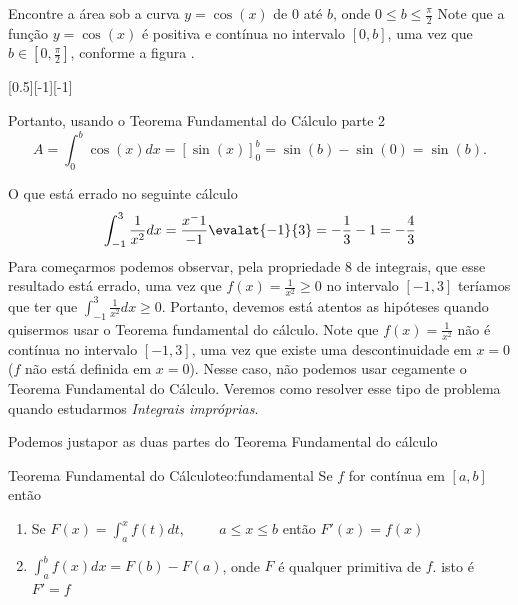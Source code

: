\begin{example}
  Encontre a área sob a curva $y=\cos(x) $ de $0$ até $b$, onde
  \(0 \leq b \leq \frac{\pi}{2}\)
  \solution
  Note que a função $y=\cos(x)$ é positiva e contínua no intervalo $[0,b]$,
  uma vez que \(b \in [0, \frac{\pi}{2}]\), conforme a figura .

  [0.5][-1][-1]

  Portanto, usando o Teorema Fundamental do Cálculo parte 2
  \[
  A
  = \int_0^b \cos(x) dx
  = \left[ \sin(x) \right]^{b}_{0}
  = \sin(b)- \sin(0)
  = \sin(b).
  \]
\end{example}

\begin{example}
  O que está errado no seguinte cálculo
  \[
  \int_{-1}^3 \frac{1}{x^2} dx
  = \frac{x^-1}{-1} \evalat{-1}{3}
  = - \frac{1}{3} - 1
  = - \frac{4}{3}
  \]
  \solution
  Para começarmos podemos observar, pela propriedade 8 de integrais, que esse
  resultado está errado, uma vez que $f(x)= \frac{1}{x^2} \geq 0$ no intervalo
  $[-1,3]$ teríamos que ter que $\int_{-1}^3 \frac{1}{x^2} dx \geq 0$.
  Portanto, devemos está atentos as hipóteses quando quisermos usar o Teorema
  fundamental do cálculo. Note que $f(x)=\frac{1}{x^2}$ não é contínua no
  intervalo $[-1,3]$, uma vez que existe uma descontinuidade em $x=0$ ($f$ não
  está definida em $x=0$). Nesse caso, não podemos usar cegamente o Teorema
  Fundamental do Cálculo. Veremos como resolver esse tipo de problema quando
  estudarmos \emph{Integrais impróprias}.
\end{example}

Podemos justapor as duas partes do Teorema Fundamental do cálculo

\begin{teorema}{Teorema Fundamental do Cálculo}{teo:fundamental}
  Se $f$ for contínua em $[a,b]$ então
  \begin{enumerate}
    \item Se $F(x)= \int_a^x f(t)dt, \hspace{1cm} a \leq x \leq b$
    então $F'(x)=f(x)$
    \item \(\int_a^{b}f(x)dx= F(b)-F(a)\),
    onde $F$ é qualquer primitiva de $f$. isto é $F'=f$
  \end{enumerate}
\end{teorema}

